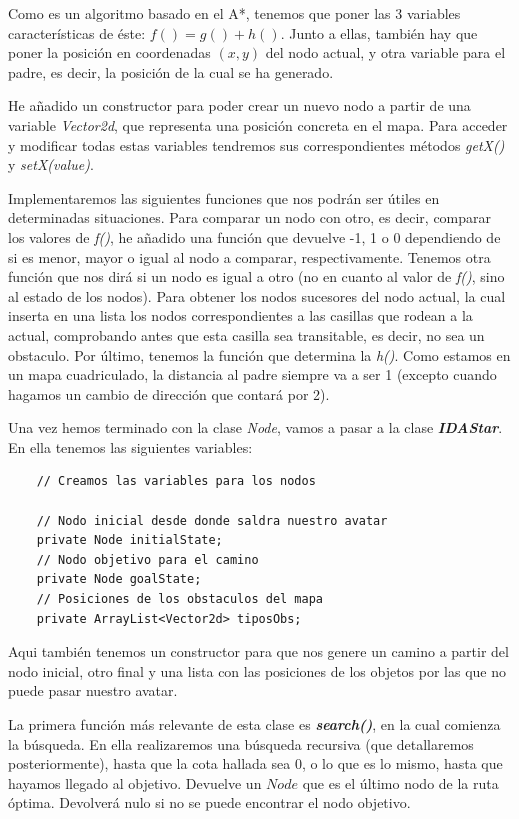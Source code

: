 \documentclass[11pt,a4paper]{article}
\begin{document}
Como es un algoritmo basado en el A*, tenemos que poner las 3 variables características de éste: $f()=g() + h()$.
Junto a ellas, también hay que poner la posición en coordenadas $(x,y)$ del nodo actual, y otra variable para
el padre, es decir, la posición de la cual se ha generado.

He añadido un constructor para poder crear un nuevo nodo a partir de una variable \textit{Vector2d}, que
representa una posición concreta en el mapa. Para acceder y modificar todas estas variables tendremos sus
correspondientes métodos \textit{getX()} y \textit{setX(value)}.

Implementaremos las siguientes funciones que nos podrán ser útiles en determinadas situaciones. Para comparar
un nodo con otro, es decir, comparar los valores de \textit{f()}, he añadido una función que devuelve -1, 1 o 0
dependiendo de si es menor, mayor o igual al nodo a comparar, respectivamente. Tenemos otra función que nos
dirá si un nodo es igual a otro (no en cuanto al valor de \textit{f()}, sino al estado de los nodos). Para
obtener los nodos sucesores del nodo actual, la cual inserta en una lista los nodos correspondientes a las
casillas que rodean a la actual, comprobando antes que esta casilla sea transitable, es decir, no sea un
obstaculo. Por último, tenemos la función que determina la \textit{h()}. Como estamos en un mapa cuadriculado,
la distancia al padre siempre va a ser 1 (excepto cuando hagamos un cambio de dirección que contará por 2).

Una vez hemos terminado con la clase \textit{Node}, vamos a pasar a la clase \textbf{\textit{IDAStar}}. En
ella tenemos las siguientes variables:
\begin{lstlisting}
    // Creamos las variables para los nodos

    // Nodo inicial desde donde saldra nuestro avatar
    private Node initialState;
    // Nodo objetivo para el camino
    private Node goalState;
    // Posiciones de los obstaculos del mapa
    private ArrayList<Vector2d> tiposObs;

\end{lstlisting}

Aqui también tenemos un constructor para que nos genere un camino a partir del nodo inicial, otro final y una
lista con las posiciones de los objetos por las que no puede pasar nuestro avatar.

La primera función más relevante de esta clase es \textbf{\textit{search()}}, en la cual comienza la
búsqueda. En ella realizaremos una búsqueda recursiva (que detallaremos posteriormente), hasta que la cota
hallada sea 0, o lo que es lo mismo, hasta que hayamos llegado al objetivo. Devuelve un $Node$ que es el
último nodo de la ruta óptima. Devolverá nulo si no se puede encontrar el nodo objetivo.
\end{document}
